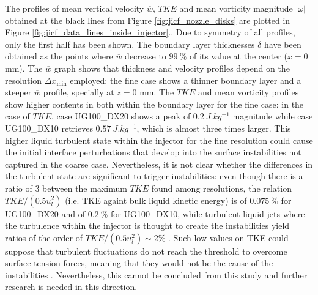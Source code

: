 The profiles of mean vertical velocity $\overline{w}$, $TKE$ and mean vorticity magnitude $|\overline{\omega}|$ obtained at the black lines from Figure \ref{fig:jicf_nozzle_disks} are plotted in Figure \ref{fig:jicf_data_lines_inside_injector}.. Due to symmetry of all profiles, only the first half has been shown. The boundary layer thicknesses $\delta$ have been obtained as the points where $\overline{w}$ decrease to $99~\%$ of its value at the center ($x = 0$ mm). The $\overline{w}$ graph shows that thickness and velocity profiles depend on the resolution $\Delta x_\mathrm{min}$ employed: the fine case shows a thinner boundary layer and a steeper $\overline{w}$ profile, specially at $z = 0$ mm. The $TKE$ and mean vorticity profiles show higher contents in both within the boundary layer for the fine case: in the case of $TKE$, case UG100\_DX20 shows a peak of $0.2~J.kg^{-1}$ magnitude while case UG100\_DX10 retrieves $0.57~J.kg^{-1}$, which is almost three times larger. This higher liquid turbulent state within the injector for the fine resolution could cause the initial interface perturbations that develop into the surface instabilities not captured in the coarse case. Nevertheless, it is not clear whether the differences in the turbulent state are significant to trigger instabilities: even though there is a ratio of 3 between the maximum $TKE$ found among resolutions, the relation $TKE/ \left( 0.5 u_l^2 \right)$ (i.e. TKE againt bulk liquid kinetic energy) is of $0.075~\%$ for UG100\_DX20 and of $0.2~\%$ for UG100\_DX10, while turbulent liquid jets where the turbulence within the injector is thought to create the instabilities  yield ratios of the order of $TKE/ \left( 0.5 u_l^2 \right) \sim 2 \%$ . Such low values on TKE could suppose that turbulent fluctuations do not reach the threshold to overcome surface tension forces, meaning that they would not be the cause of the instabilities . Nevertheless, this cannot be concluded from this study and further research is needed in this direction.


